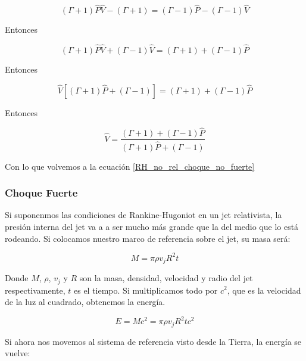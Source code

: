 \documentclass[12pt,a4paper]{book}
\begin{document}
\begin{equation*}
( \Gamma + 1 ) \hat{P} \hat { V } - ( \Gamma + 1 ) = ( \Gamma - 1 ) \hat { P } - ( \Gamma - 1 ) \hat { V }
\end{equation*}

Entonces

\begin{equation*}
( \Gamma + 1 ) \hat { P } \hat { V } + ( \Gamma - 1 ) \hat { V } = ( \Gamma + 1 ) + ( \Gamma - 1 ) \hat { P }
\end{equation*}

Entonces

\begin{equation*}
\hat { V } [ ( \Gamma + 1 ) \hat { P } + ( \Gamma - 1 ) ] = ( \Gamma + 1 ) + ( \Gamma - 1 ) \hat { P }
\end{equation*}

Entonces

\begin{equation}
\hat { V } = \frac { ( \Gamma + 1 ) + ( \Gamma - 1 ) \hat { P } } { ( \Gamma + 1 ) \hat { P } + ( \Gamma - 1 ) }
\end{equation}

Con lo que volvemos a la ecuación \ref{RH_no_rel_choque_no_fuerte}

\subsubsection{Choque Fuerte}

Si suponenmos las condiciones de Rankine-Hugoniot en un jet relativista, la presión interna del jet va a a ser mucho más grande que la del medio que lo está
rodeando. Si colocamos nuestro marco de referencia sobre el jet, su masa será:

\begin{equation}
  M = \pi \rho v_j R^2 t
\end{equation}

Donde $M$, $\rho$, $v_j$ y $R$ son la masa, densidad, velocidad y radio del jet respectivamente, $t$ es el tiempo. Si multiplicamos todo por $c^2$,
que es la velocidad de la luz al cuadrado, obtenemos la energía.

\begin{equation}
  E = Mc^2 = \pi \rho v_j R^2 t c^2
\end{equation}



Si ahora nos movemos al sistema de referencia visto desde la Tierra, la energía se vuelve:
\end{document}

